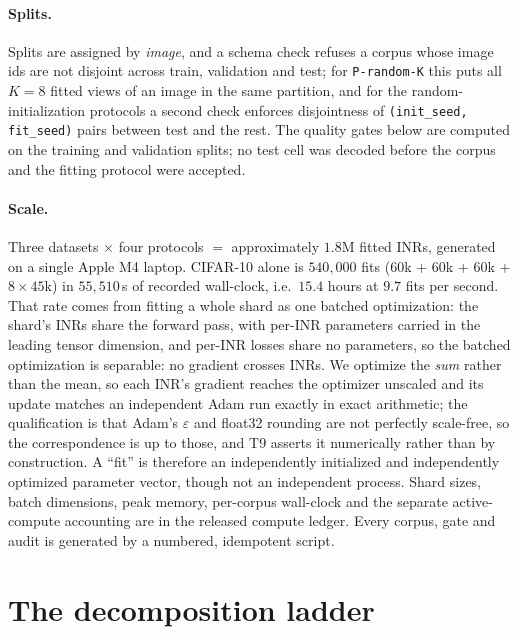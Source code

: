 \documentclass[10pt,twocolumn,letterpaper]{article}
\theoremstyle{definition}
\begin{document}
\paragraph{Splits.} Splits are assigned by \emph{image}, and a schema check refuses a corpus whose
image ids are not disjoint across train, validation and test; for \texttt{P-random-K} this puts all
$K=8$ fitted views of an image in the same partition, and for the random-initialization protocols a
second check enforces disjointness of \texttt{(init\_seed, fit\_seed)} pairs between test and the
rest. The quality gates below are computed on the training and validation splits; no test cell was
decoded before the corpus and the fitting protocol were accepted.

\paragraph{Scale.} Three datasets $\times$ four protocols $=$ approximately $1.8$M fitted INRs,
generated on a single Apple M4 laptop. CIFAR-10 alone is $540{,}000$ fits ($60$k $+$ $60$k $+$
$60$k $+$ $8\times45$k) in $55{,}510$\,s of recorded wall-clock, i.e.\ $15.4$ hours at $9.7$ fits per
second. That rate comes from fitting a whole shard as one batched optimization: the shard's INRs
share the forward pass, with per-INR parameters carried in the leading tensor dimension, and
per-INR losses share no parameters, so the batched optimization is separable: no gradient crosses
INRs. We optimize the \emph{sum} rather than the mean, so each INR's gradient reaches the optimizer
unscaled and its update matches an independent Adam run exactly in exact arithmetic; the
qualification is that Adam's $\varepsilon$ and float32 rounding are not perfectly scale-free, so the
correspondence is up to those, and T9 asserts it numerically rather than by construction. A ``fit''
is therefore an independently initialized and independently optimized parameter vector, though not
an independent process. Shard sizes, batch dimensions, peak memory, per-corpus wall-clock and the
separate active-compute accounting are in the released compute ledger. Every corpus, gate and audit
is generated by a numbered, idempotent script.

\section{The decomposition ladder}\label{sec:ladder}
\end{document}
